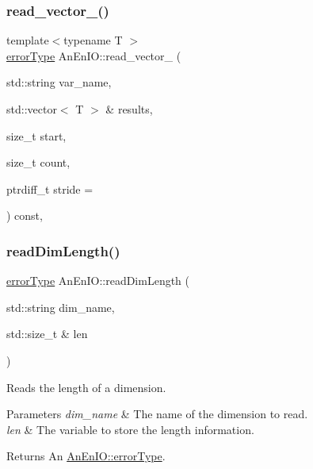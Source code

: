 \mbox{\label{class_an_en_i_o_a9a0c27d0baddc7e27b25e1d13ac4f313}} 
\subsubsection{\texorpdfstring{read\+\_\+vector\+\_\+()}{read\_vector\_()}\hspace{0.1cm}{\footnotesize\ttfamily [3/3]}}
{\footnotesize\ttfamily template$<$typename T $>$ \\
\mbox{\hyperlink{class_an_en_i_o_aa56bc1ec6610b86db4349bce20f9ead0}{error\+Type}} An\+En\+I\+O\+::read\+\_\+vector\+\_\+ (\begin{DoxyParamCaption}\item[{std\+::string}]{var\+\_\+name,  }\item[{std\+::vector$<$ T $>$ \&}]{results,  }\item[{size\+\_\+t}]{start,  }\item[{size\+\_\+t}]{count,  }\item[{ptrdiff\+\_\+t}]{stride = {} }\end{DoxyParamCaption}) const\hspace{0.3cm}{\ttfamily [inline]}, {\ttfamily [protected]}}

\mbox{\label{class_an_en_i_o_a5ca1c7df3da9720967d7ed06f2dfe09b}} 
\subsubsection{\texorpdfstring{read\+Dim\+Length()}{readDimLength()}}
{\footnotesize\ttfamily \mbox{\hyperlink{class_an_en_i_o_aa56bc1ec6610b86db4349bce20f9ead0}{error\+Type}} An\+En\+I\+O\+::read\+Dim\+Length (\begin{DoxyParamCaption}\item[{std\+::string}]{dim\+\_\+name,  }\item[{std\+::size\+\_\+t \&}]{len }\end{DoxyParamCaption})}

Reads the length of a dimension.


\begin{DoxyParams}{Parameters}
{\em dim\+\_\+name} & The name of the dimension to read. \\
\hline
{\em len} & The variable to store the length information. \\
\hline
\end{DoxyParams}
\begin{DoxyReturn}{Returns}
An \mbox{\hyperlink{class_an_en_i_o_aa56bc1ec6610b86db4349bce20f9ead0}{An\+En\+I\+O\+::error\+Type}}. 
\end{DoxyReturn}
\mbox{\label{class_an_en_i_o_aa58735032dd6f54c83d6450842922d3f}} 
